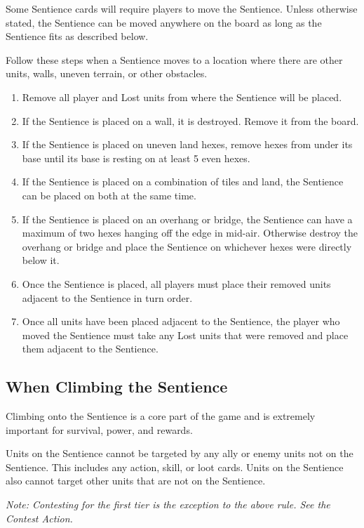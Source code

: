 \documentclass[../main.tex]{subfiles}
\begin{document}
Some Sentience cards will require players to move the Sentience. Unless otherwise stated, the Sentience can be moved anywhere on the board as long as the Sentience fits as described below.

Follow these steps when a Sentience moves to a location where there are other units, walls, uneven terrain, or other obstacles.

\begin{enumerate}
    \item Remove all player and Lost units from where the Sentience will be placed.
    \item If the Sentience is placed on a wall, it is destroyed. Remove it from the board.
    \item If the Sentience is placed on uneven land hexes, remove hexes from under its base until its base is resting on at least 5 even hexes.
    \item If the Sentience is placed on a combination of tiles and land, the Sentience can be placed on both at the same time.
    \item If the Sentience is placed on an overhang or bridge, the Sentience can have a maximum of two hexes hanging off the edge in mid-air. Otherwise destroy the overhang or bridge and place the Sentience on whichever hexes were directly below it.
    \item Once the Sentience is placed, all players must place their removed units adjacent to the Sentience in turn order.
    \item Once all units have been placed adjacent to the Sentience, the player who moved the Sentience must take any Lost units that were removed and place them adjacent to the Sentience.
\end{enumerate}

\subsection{When Climbing the Sentience}
Climbing onto the Sentience is a core part of the game and is extremely important for survival, power, and rewards.

Units on the Sentience cannot be targeted by any ally or enemy units not on the Sentience. This includes any action, skill, or loot cards. Units on the Sentience also cannot target other units that are not on the Sentience.

\textit{Note: Contesting for the first tier is the exception to the above rule. See the Contest Action.}
\end{document}
